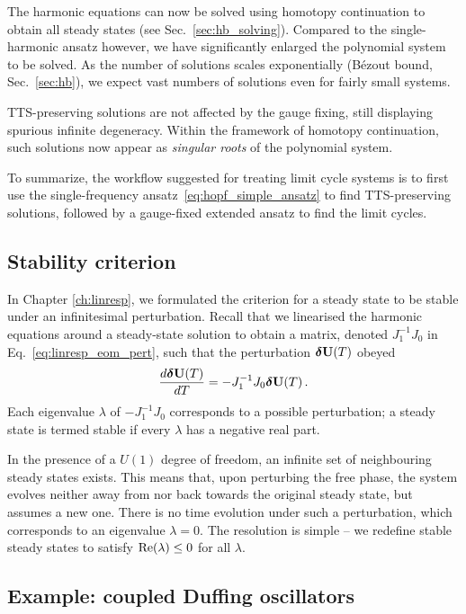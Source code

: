 The harmonic equations can now be solved using homotopy continuation to obtain all steady states (see Sec.~\ref{sec:hb_solving}). Compared to the single-harmonic ansatz however, we have significantly enlarged the polynomial system to be solved. As the number of solutions scales exponentially (B\'{e}zout bound, Sec.~\ref{sec:hb}), we expect vast numbers of solutions even for fairly small systems. 

TTS-preserving solutions are not affected by the gauge fixing, still displaying spurious infinite degeneracy. Within the framework of homotopy continuation, such solutions now appear as \textit{singular roots} of the polynomial system.

To summarize, the workflow suggested for treating limit cycle systems is to first use the single-frequency ansatz~\eqref{eq:hopf_simple_ansatz} to find TTS-preserving solutions, followed by a gauge-fixed extended ansatz to find the limit cycles.

\subsection{Stability criterion}
In Chapter \ref{ch:linresp}, we formulated the criterion for a steady state to be stable under an infinitesimal perturbation. Recall that we linearised the harmonic equations around a steady-state solution to obtain a matrix, denoted $J_1^{-1} J_0$ in Eq.~\eqref{eq:linresp_eom_pert}, such that the perturbation $\boldsymbol{\delta} \vb{U}(T)$ obeyed
\begin{equation}
\frac{d \boldsymbol{\delta} \vb{U}(T)}{d T} = -J_1^{-1} J_0 \boldsymbol{\delta} \vb{U}(T) \,.
\end{equation} 
Each eigenvalue $\lambda$ of  $-J_1^{-1} J_0$ corresponds to a possible perturbation; a steady state is termed stable if every $\lambda$ has a negative real part.

In the presence of a $U(1)$ degree of freedom, an infinite set of neighbouring steady states exists. This means that, upon perturbing the free phase, the system evolves neither away from nor back towards the original steady state, but assumes a new one. There is no time evolution under such a perturbation, which corresponds to an eigenvalue $\lambda = 0$. The resolution is simple -- we redefine stable steady states to satisfy $\text{Re} (\lambda) \leq 0$ for all $\lambda$. 

\subsection{Example: coupled Duffing oscillators} \label{sec:hopf_example}

